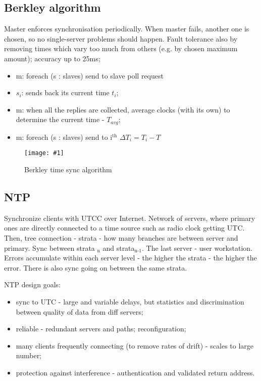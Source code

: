 \documentclass[10pt,a4paper]{article}
\newcommand{\insImg}[2] { %
	\begin{figure}[ht!] %
		\centering %
		\texttt{[image: \#1]} %
		\caption{#2} %
		\label{overflow} %
	\end{figure} %
}
\newcommand{\subscript}[1]{$_{\text{#1}}$}
\newcommand{\superscript}[1]{$^{\text{#1}}$}
\begin{document}
\subsection{Berkley algorithm}
Master enforces synchronisation periodically. When master fails, another one is chosen, so no single-server problems should happen. Fault tolerance also by removing times which vary too much from others (e.g. by chosen maximum amount); accuracy up to 25ms;
\begin{itemize}
	\item m: foreach (s : slaves) send to slave poll request
	\item $s_i$: sends back its current time $t_i$;
	\item m: when all the replies are collected, average clocks (with its own) to determine the current time - $T_{avg}$;
	\item m: foreach (s : slaves) send to i\superscript{th} $\Delta T_i = T_i - T$
\end{itemize}

\insImg{berkley}{Berkley time sync algorithm}

\subsection{NTP}
Synchronize clients with UTCC over Internet. Network of servers, where primary ones are directly connected to a time source such as radio clock getting UTC. Then, tree connection - strata - how many branches are between server and primary. Sync between strata \subscript{n} and strata\subscript{n-1}. The last server - user workstation. Errors accumulate within each server level - the higher the strata - the higher the error. 
There is also sync going on between the same strata.

NTP design goals:
\begin{itemize}
	\item sync to UTC - large and variable delays, but statistics and discrimination between quality of data from diff servers;
	\item reliable - redundant servers and paths; reconfiguration;
	\item many clients frequently connecting (to remove rates of drift) - scales to large number;
	\item protection against interference - authentication and validated return address.
\end{itemize}
\end{document}
